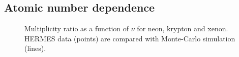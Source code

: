 \subsection{Atomic number dependence}

\begin{figure}[tbp]
  \centering
{}
\caption {Multiplicity ratio as a function of $\nu$ for neon, krypton and 
xenon. HERMES data \cite{Airapetian:2011jp} (points) are compared with 
Monte-Carlo simulation (lines).}
\label{fig:RNu}
\end{figure}


